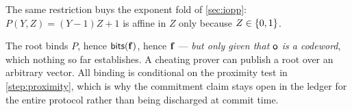 The same restriction buys the exponent fold of \cref{sec:iopp}: $P(Y,Z)=(Y-1)Z+1$
is affine in $Z$ only because $Z\in\{0,1\}$.

\begin{remark}
The root binds $P$, hence $\mathsf{bits}(\mathbf{f})$, hence $\mathbf{f}$ --- \emph{but only given
that $\mathsf{o}$ is a codeword}, which nothing so far establishes. A cheating prover
can publish a root over an arbitrary vector. All binding is conditional on the
proximity test in \cref{step:proximity}, which is why the commitment claim stays
open in the ledger for the entire protocol rather than being discharged at
commit time.
\end{remark}

